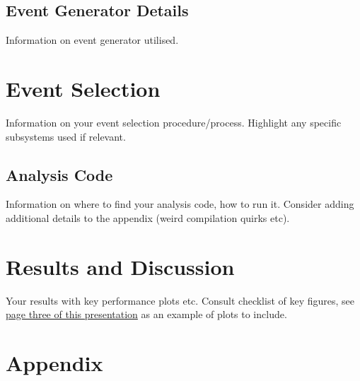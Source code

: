 \documentclass[letterpaper,12pt]{article}
\begin{document}
\subsection{Event Generator Details}\label{subsec:EvGen}

Information on event generator utilised.

\section{Event Selection}\label{sec:EvSelect}

Information on your event selection procedure/process. Highlight any specific subsystems used if relevant.

\subsection{Analysis Code}\label{subsec:Analysis_Code}

Information on where to find your analysis code, how to run it. Consider adding additional details to the appendix (weird compilation quirks etc).

\section{Results and Discussion}\label{sec:Results_Discuss}

Your results with key performance plots etc. Consult checklist of key figures, see \href{https://docs.google.com/presentation/d/1bqz9_GPvPoW4oz1m8KvzuUhPJZBe_CfU5APMt0LjfaU/edit?slide=id.g3338e3f4b69_0_51#slide=id.g3338e3f4b69_0_51}{page three of this presentation} as an example of plots to include.

\pagebreak
\appendix
\section{Appendix}


 

\end{document}

